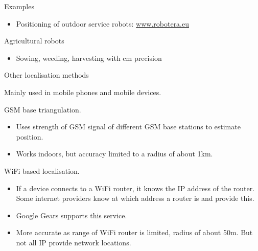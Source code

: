 \documentclass[compress]{beamer}
\begin{document}
\begin{frame}{Examples}

\begin{itemize}

\item
  Positioning of outdoor service robots:
  \href{http://www.robotera.eu/}{www.robotera.eu}
\end{itemize}

Agricultural robots

\begin{itemize}

\item
  Sowing, weeding, harvesting with cm precision
\end{itemize}

\end{frame}

\begin{frame}{Other localisation methods}

Mainly used in mobile phones and mobile devices.

GSM base triangulation.

\begin{itemize}

\item
  Uses strength of GSM signal of different GSM base stations to estimate
  position.
\item
  Works indoors, but accuracy limited to a radius of about 1km.
\end{itemize}

WiFi based localisation.

\begin{itemize}

\item
  If a device connects to a WiFi router, it knows the IP address of the
  router. Some internet providers know at which address a router is and
  provide this.
\item
  Google Gears supports this service.
\item
  More accurate as range of WiFi router is limited, radius of about 50m.
  But not all IP provide network locations.
\end{itemize}

\end{frame}
\end{document}
